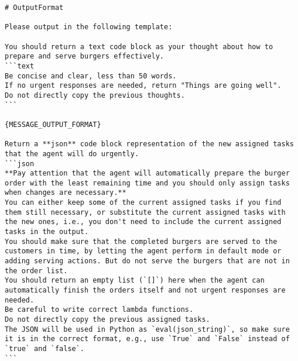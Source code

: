 \begin{lstlisting}
# OutputFormat

Please output in the following template:

You should return a text code block as your thought about how to prepare and serve burgers effectively.
```text
Be concise and clear, less than 50 words.
If no urgent responses are needed, return "Things are going well".
Do not directly copy the previous thoughts.
```

{MESSAGE_OUTPUT_FORMAT}

Return a **json** code block representation of the new assigned tasks that the agent will do urgently.
```json
**Pay attention that the agent will automatically prepare the burger order with the least remaining time and you should only assign tasks when changes are necessary.**
You can either keep some of the current assigned tasks if you find them still necessary, or substitute the current assigned tasks with the new ones, i.e., you don't need to include the current assigned tasks in the output.
You should make sure that the completed burgers are served to the customers in time, by letting the agent perform in default mode or adding serving actions. But do not serve the burgers that are not in the order list.
You should return an empty list (`[]`) here when the agent can automatically finish the orders itself and not urgent responses are needed.
Be careful to write correct lambda functions.
Do not directly copy the previous assigned tasks.
The JSON will be used in Python as `eval(json_string)`, so make sure it is in the correct format, e.g., use `True` and `False` instead of `true` and `false`.
```
\end{lstlisting}